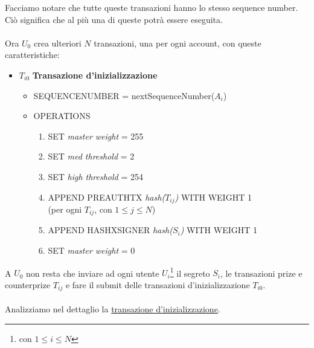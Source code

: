 Facciamo notare che tutte queste transazioni hanno lo stesso sequence number.
Ciò significa che al più una di queste potrà essere eseguita.
\\
\\
Ora $ U_0 $ crea ulteriori $ N $ transazioni, una per ogni account,
con queste caratteristiche:
\begin{itemize}
	\item \label{trans-init:title}
	      $T_{i0} $ \textbf{Transazione d'inizializzazione}
	      \begin{itemize}
		      \item SEQUENCE\textunderscore NUMBER = nextSequenceNumber($ A_i $)
		      \item OPERATIONS
		            \begin{enumerate}
			            \item \label{trans-init:set-master-weight-255}
			                  SET \textit{master weight} = 255
			            \item \label{trans-init:set-med-thres}
			                  SET \textit{med threshold} = 2
			            \item \label{trans-init:set-high-thres}
			                  SET \textit{high threshold} = 254
			            \item \label{trans-init:set-pre-auth-tx}
			                  APPEND PRE\textunderscore AUTH\textunderscore TX
			                  \textit{hash($ T_{ij} $)} WITH WEIGHT 1
			                  \\(per ogni $ T_{ij} $, con $ 1 \leq j \leq N $)
			            \item \label{trans-init:set-hashx-signer}
			                  APPEND HASHX\textunderscore SIGNER
			                  \textit{hash($ S_{i} $)} WITH WEIGHT 1
			            \item \label{trans-init:set-master-weight-0}
			                  SET \textit{master weight} = 0

		            \end{enumerate}
	      \end{itemize}
\end{itemize}
A $ U_0 $ non resta che inviare ad ogni utente $ U_i $\footnote{con $ 1 \leq i \leq N $}
il segreto $ S_i $, le transazioni prize e counterprize
$ T_{ij} $ e fare il submit delle
transazioni d'inizializzazione $ T_{i0} $.
\\
\\
Analizziamo nel dettaglio la \hyperref[trans-init:title]{transazione d'inizializzazione}.
